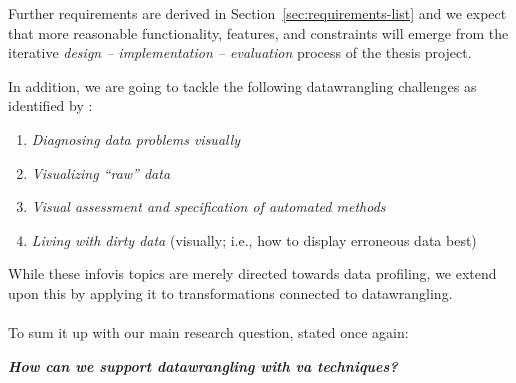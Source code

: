 Further requirements are derived in Section~\ref{sec:requirements-list} and we expect that more reasonable functionality, features, and constraints will emerge from the iterative \emph{design -- implementation -- evaluation} process of the thesis project.

In addition, we are going to tackle the following \gls{datawrangling} challenges as identified by \cite{Kandel2011b}:

\begin{enumerate}
  \item \emph{Diagnosing data problems visually}
  \item \emph{Visualizing ``raw'' data}
  \item \emph{Visual assessment and specification of automated methods}
  \item \emph{Living with dirty data} (visually; i.e., how to display erroneous data best)
\end{enumerate}

While these \gls{infovis} topics are merely directed towards data profiling, we extend upon this by applying it to transformations connected to \gls{datawrangling}.
\\\\
To sum it up with our main research question, stated once again:

\emph{\textbf{How can we support \gls{datawrangling} with \gls{va} techniques?}}

